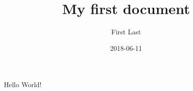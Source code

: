 \documentclass{article}
\title{My first document}
\date{2018-06-11}
\author{First Last}
\begin{document}
  \maketitle
  \newpage

  Hello World!
\end{document}
